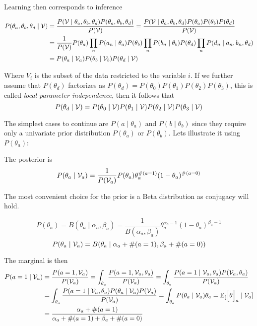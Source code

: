 Learning then corresponds to inference

\[
  \begin{aligned}
    P(\theta_{a}, \theta_{b}, \theta_{d}\mid \mathcal{V}) &= \frac{P(\mathcal{V} \mid \theta_{a}, \theta_{b}, \theta_{d})P(\theta_{a}, \theta_{b}, \theta_{d})}{P(\mathcal{V})} =\frac{P(\mathcal{V} \mid \theta_{a}, \theta_{b}, \theta_{d})P(\theta_{a}) P(\theta_{b})P( \theta_{d})}{P(\mathcal{V})}\\
    &= \frac{1}{P(\mathcal{V})}P(\theta_{a})\prod_{n}P(a_{n}\mid \theta_{a})P(\theta_{b})\prod_{n}P(b_{n}\mid \theta_{b})P(\theta_{d})\prod_{n}P(d_{n}\mid a_{n}, b_{n},\theta_{d})\\
    &= P(\theta_{a} \mid \mathcal{V}_{a} )P(\theta_{b}\mid \mathcal{V}_{b})P(\theta_{d} \mid \mathcal{V})
  \end{aligned}
\]

Where \(V_{i}\) is the subset of the data restricted to the variable \(i\). If
we further assume that \(P(\theta_{d})\) factorizes as
\(P(\theta_{d}) = P(\theta_{0})P(\theta_{1})P(\theta_{2})P(\theta_{3})\),
this is called \emph{local parameter independence}, then it follows that
\[
  P(\theta_{d}\mid \mathcal{V}) = P(\theta_{0} \mid \mathcal{V} )P(\theta_{1} \mid \mathcal{V} )P(\theta_{2} \mid \mathcal{V} )P(\theta_{3} \mid \mathcal{V} )
\]

The simplest cases to continue are \(P(a\mid \theta_{a})\) and
\(P(b \mid \theta_{b})\) since they require only a univariate prior distribution
\(P(\theta_{a})\) or \(P(\theta_{b})\). Lets illustrate it using
\(P(\theta_{a})\):

The posterior is
\[
  P(\theta_{a} \mid \mathcal{V}_{a}) = \frac{1}{P(\mathcal{V}_{a})}P(\theta_{a})\theta_{a}^{\#(a=1)}(1-\theta_{a})^{\#(a=0)}
\]

The most convenient choice for the prior is a Beta distribution as conjugacy
will hold.

\[
  P(\theta_{a}) = B(\theta_{a} \mid \alpha_{a}, \beta_{a}) = \frac{1}{B(\alpha_{a}, \beta_{a})}\theta_{a}^{\alpha_{a}-1}(1-\theta_{a})^{\beta_{a} - 1}
\]
\[
  P(\theta_{a} \mid \mathcal{V}_{a}) = B(\theta_{a} \mid \alpha_{a} + \#(a=1), \beta_{a} + \#(a = 0))
\]

The marginal is then
\[
  \begin{aligned}
    P(a = 1 \mid \mathcal{V}_{a})
    &= \frac{P(a = 1, \mathcal{V}_{a})}{P(\mathcal{V}_{a})} = \int_{\theta_{a}}  \frac{P(a = 1, \mathcal{V}_{a}, \theta_{a})}{P(\mathcal{V}_{a})} =  \int_{\theta_{a}}  \frac{P(a = 1 \mid \mathcal{V}_{a}, \theta_{a}) P(\mathcal{V}_{a}, \theta_{a})}{P(\mathcal{V}_{a})} \\
    &=  \int_{\theta_{a}}  \frac{P(a = 1 \mid \mathcal{V}_{a}, \theta_{a}) P(\theta_{a} \mid \mathcal{V}_{a})P(\mathcal{V}_{a})}{P(\mathcal{V}_{a})} = \int_{\theta_{a}}P(\theta_{a}\mid \mathcal{V}_{a})\theta_{a} = \mathbb{E}_{[}\Big[\theta\Big]_{a} \mid \mathcal{V}_{a}] \\
    &= \frac{\alpha_{a} + \#(a= 1)}{\alpha_{a} + \#(a=1) + \beta_{a} + \#(a=0)}
  \end{aligned}
\]

